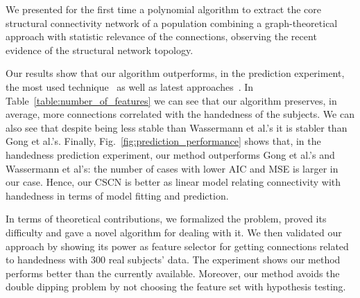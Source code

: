 We presented for the first time a polynomial algorithm to extract the core structural connectivity network of a population combining a graph-theoretical approach with statistic relevance of the connections, observing the recent evidence of the structural network topology.

Our results show that our algorithm outperforms, in the prediction experiment, the most used technique~\cite{Gong2009} as well as latest approaches~\cite{Wassermann2016}. In Table~\ref{table:number_of_features} we can see that our algorithm preserves, in average, more connections correlated with the handedness of the subjects. We can also see that despite being less stable than Wassermann et al.'s it is stabler than Gong et al.'s. Finally, Fig.~\ref{fig:prediction_performance} shows that, in the handedness prediction experiment, our method outperforms  Gong et al.'s and Wassermann et al's: the number of cases with lower AIC and MSE is larger in our case. Hence, our CSCN is better as linear model relating connectivity with handedness in terms of model fitting and prediction.


In terms of theoretical contributions, we formalized the problem, proved its difficulty and gave a novel algorithm for dealing with it. We then validated our approach by showing its power as feature selector for getting connections related to handedness with 300 real subjects' data. The experiment shows our method performs better than the currently available. Moreover, our method avoids the double dipping problem by not choosing the feature set with hypothesis testing.